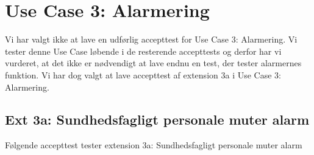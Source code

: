 \section{Use Case 3: Alarmering}
Vi har valgt ikke at lave en udførlig accepttest for Use Case 3: Alarmering. Vi tester denne Use Case løbende i de resterende accepttests og derfor har vi vurderet, at det ikke er nødvendigt at lave endnu en test, der tester alarmernes funktion. Vi har dog valgt at lave accepttest af extension 3a i Use Case 3: Alarmering.
\vspace{0.3cm}

\subsection{Ext 3a: Sundhedsfagligt personale muter alarm}
Følgende accepttest tester extension 3a: Sundhedsfagligt personale muter alarm
\clearpage
